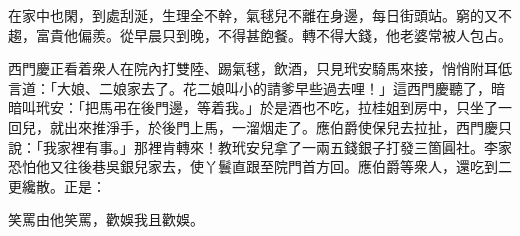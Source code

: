 \begin{myquote}
在家中也閑，到處刮涎，生理全不幹，{}氣毬兒不離在身邊，每日街頭站。窮的又不趨，富貴他偏羨。從早晨只到晚，不得甚飽餐。轉不得大錢，他老婆常被人包占。
\end{myquote}

西門慶正看着衆人在院內打雙陸、踢氣毬，飲酒，只見玳安騎馬來接，悄悄附耳低言道：「大娘、二娘家去了。花二娘叫小的請爹早些過去哩！」這西門慶聽了，暗暗叫玳安：「把馬弔在後門邊，等着我。」於是酒也不吃，拉桂姐到房中，只坐了一回兒，就出來推淨手，於後門上馬，一溜烟走了。應伯爵使保兒去拉扯，西門慶只說：「我家裡有事。」那裡肯轉來！教玳安兒拿了一兩五錢銀子打發三箇圓社。李家恐怕他又往後巷吳銀兒家去，使丫鬟直跟至院門首方回。應伯爵等衆人，還吃到二更纔散。正是：

\begin{myquote}
笑罵由他笑罵，歡娛我且歡娛。
\end{myquote}

